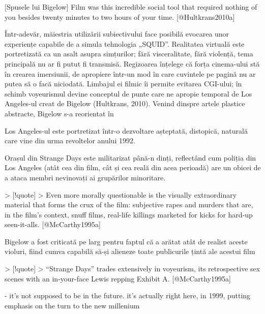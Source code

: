 \documentclass[a4paper, 12pt]{article}
\begin{document}
[Spusele lui Bigelow] Film was this incredible social tool that required nothing of you besides twenty minutes to two hours of your time. [@Hultkrans2010a]\break

Într-adevăr, măiestria utilizării subiectivului face posibilă evocarea unor experiențe capabile de a simula tehnologia „SQUID”. Realitatea virtuală este portretizată ca un asalt asupra simțurilor; fără visceralitate, fără violență, tema principală nu ar fi putut fi transmisă. Regizoarea înțelege că forța cinema-ului stă în crearea imersiunii, de apropiere într-un mod în care cuvintele pe pagină nu ar putea să o facă niciodată. Limbajul ei filmic îi permite evitarea CGI-ului; în schimb voyeurismul devine conceptul de punte care ne apropie temporal de Los Angeles-ul creat de Bigelow (Hultkrans, 2010). Venind dinspre artele plastice abstracte, Bigelow s-a reorientat în 

Los Angeles-ul este portretizat într-o dezvoltare așteptată, distopică, naturală care vine din urma revoltelor anului 1992. 

Orașul din Strange Days este militarizat până-n dinți, reflectând cum poliția din Los Angeles (atât cea din film, cât și cea reală din acea perioadă) are un obicei de a ataca membri nevinovați ai grupărilor minoritare.

> [!quote]
> Even more morally questionable is the visually extraordinary material that forms the crux of the film: subjective rapes and murders that are, in the film’s context, snuff films, real-life killings marketed for kicks for hard-up seen-it-alls. [@McCarthy1995a]

Bigelow a fost criticată pe larg pentru faptul că a arătat atât de realist aceste violuri, fiind cumva capabilă să-și alieneze toate publicurile țintă ale acestui film

> [!quote]
> “Strange Days” trades extensively in voyeurism, its retrospective sex scenes with an in-your-face Lewis repping Exhibit A. [@McCarthy1995a]



- it's not supposed to be in the future. it's actually right here, in 1999, putting emphasis on the turn to the new millenium
\end{document}
